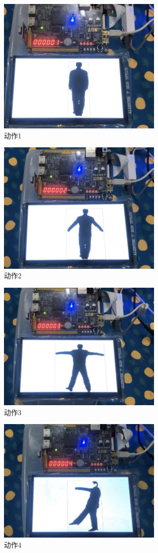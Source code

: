 \documentclass[UTF-8, a4paper, 12pt]{ctexart}
\begin{document}
\begin{figure}[htbp]
    \centering
    \includegraphics[width=8cm]{figs/f3.jpg}
    \caption{动作1}
\end{figure}
\begin{figure}[htbp]
    \centering
    \includegraphics[width=8cm]{figs/f4.jpg}
    \caption{动作2}
\end{figure}
\begin{figure}[htbp]
    \centering
    \includegraphics[width=8cm]{figs/f5.jpg}
    \caption{动作3}
\end{figure}
\begin{figure}[htbp]
    \centering
    \includegraphics[width=8cm]{figs/f6.jpg}
    \caption{动作4}
\end{figure}
\end{document}
